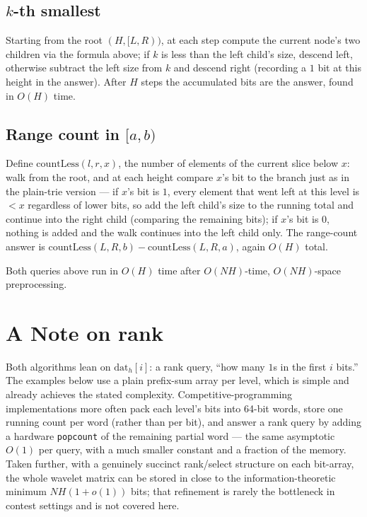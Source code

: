 \documentclass[11pt]{article}
\begin{document}
\subsection{$k$-th smallest}
Starting from the root $(H, [L, R))$, at each step compute the current
node's two children via the formula above; if $k$ is less than the left
child's size, descend left, otherwise subtract the left size from $k$ and
descend right (recording a $1$ bit at this height in the answer). After $H$
steps the accumulated bits are the answer, found in $O(H)$ time.

\subsection{Range count in $[a, b)$}
Define $\mathrm{countLess}(l, r, x)$, the number of elements of the current
slice below $x$: walk from the root, and at each height compare $x$'s bit
to the branch just as in the plain-trie version --- if $x$'s bit is $1$,
every element that went left at this level is $< x$ regardless of lower
bits, so add the left child's size to the running total and continue into
the right child (comparing the remaining bits); if $x$'s bit is $0$,
nothing is added and the walk continues into the left child only. The
range-count answer is $\mathrm{countLess}(L, R, b) - \mathrm{countLess}(L,
R, a)$, again $O(H)$ total.

\begin{theorembox}
Both queries above run in $O(H)$ time after $O(NH)$-time, $O(NH)$-space
preprocessing.
\end{theorembox}

\section{A Note on rank}
Both algorithms lean on $\mathrm{dat}_h[i]$: a rank query, ``how many $1$s
in the first $i$ bits.'' The examples below use a plain prefix-sum array
per level, which is simple and already achieves the stated complexity.
Competitive-programming implementations more often pack each level's bits
into 64-bit words, store one running count per word (rather than per bit),
and answer a rank query by adding a hardware \texttt{popcount} of the
remaining partial word --- the same asymptotic $O(1)$ per query, with a
much smaller constant and a fraction of the memory. Taken further, with a
genuinely succinct rank/select structure on each bit-array, the whole
wavelet matrix can be stored in close to the information-theoretic minimum
$NH(1+o(1))$ bits; that refinement is rarely the bottleneck in contest
settings and is not covered here.
\end{document}
